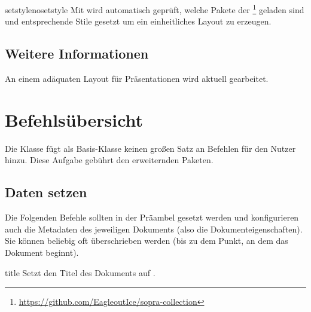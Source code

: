 \documentclass[useartcl,notoc]{sopra-paper}
\begin{document}
    \begin{argument}{setstyle}{nosetstyle}
        Mit  wird automatisch geprüft, welche Pakete der \footnote{\url{https://github.com/EagleoutIce/sopra-collection}} geladen sind und entsprechende Stile gesetzt um ein einheitliches Layout zu erzeugen.
    \end{argument}

    \subsection{Weitere Informationen}
    An einem adäquaten Layout für Präsentationen wird aktuell gearbeitet.

%
%
%
%

\section{Befehlsübersicht}

Die Klasse fügt als Basis-Klasse keinen großen Satz an Befehlen für
den Nutzer hinzu. Diese Aufgabe gebührt den erweiternden Paketen.

\subsection{Daten setzen}
\label{sec:DatenSetzen}
Die Folgenden Befehle sollten in der Präambel gesetzt werden und konfigurieren
auch die Metadaten des jeweiligen Dokuments (also die Dokumenteigenschaften).
Sie können beliebig oft überschrieben werden (bis zu dem Punkt, an dem
das Dokument beginnt). 

\begin{command}{title}{}
    Setzt den Titel des Dokuments auf .
\end{command}
\end{document}
